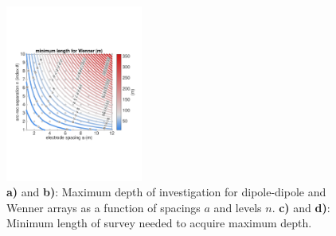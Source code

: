\documentclass[a4paper,12pt]{article}
\begin{document}
\begin{figure}[!h]
\includegraphics[trim={20 170 30 180},clip,width=0.4\textwidth]{../pics/min-length-wenner.pdf}
\caption{{\bf a)} and {\bf b)}: Maximum depth of investigation for dipole-dipole and Wenner arrays as a function of spacings $a$ and levels $n$. {\bf c)} and {\bf d)}: Minimum length of survey needed to acquire maximum depth.}
\label{fig:depth-length}
\end{figure}
%
%
%
\newpage
\end{document}
